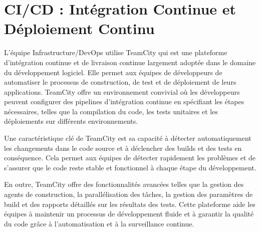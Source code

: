 \section{CI/CD : Intégration Continue et Déploiement Continu}\label{sec:ci-cd}

L'équipe Infrastructure/DevOps utilise TeamCity qui est une plateforme d'intégration continue et de livraison continue largement adoptée dans le domaine du développement logiciel. Elle permet aux équipes de développeurs de automatiser le processus de construction, de test et de déploiement de leurs applications. TeamCity offre un environnement convivial où les développeurs peuvent configurer des pipelines d'intégration continue en spécifiant les étapes nécessaires, telles que la compilation du code, les tests unitaires et les déploiements sur différents environnements.

Une caractéristique clé de TeamCity est sa capacité à détecter automatiquement les changements dans le code source et à déclencher des builds et des tests en conséquence. Cela permet aux équipes de détecter rapidement les problèmes et de s'assurer que le code reste stable et fonctionnel à chaque étape du développement.

En outre, TeamCity offre des fonctionnalités avancées telles que la gestion des agents de construction, la parallélisation des tâches, la gestion des paramètres de build et des rapports détaillés sur les résultats des tests. Cette plateforme aide les équipes à maintenir un processus de développement fluide et à garantir la qualité du code grâce à l'automatisation et à la surveillance continue.